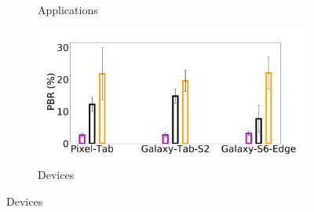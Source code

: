 \begin{figure}
\begin{subfigure}[b]{0.33\textwidth}
        \caption{Applications}
    \end{subfigure}%
    \begin{subfigure}[b]{0.33\textwidth}
        \centering
        \includegraphics[width=1\linewidth]{sections/network-work/dev-bitrate}
        \caption{Devices}
    \end{subfigure}


\end{figure}
